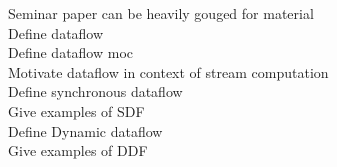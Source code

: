 Seminar paper can be heavily gouged for material \\
Define dataflow \\
Define dataflow moc \\
Motivate dataflow in context of stream computation\\
Define synchronous dataflow \\
Give examples of SDF \\
Define Dynamic dataflow \\
Give examples of DDF \\
